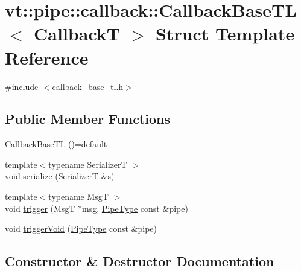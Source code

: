 \hypertarget{structvt_1_1pipe_1_1callback_1_1_callback_base_t_l}{}\section{vt\+:\+:pipe\+:\+:callback\+:\+:Callback\+Base\+TL$<$ CallbackT $>$ Struct Template Reference}
\label{structvt_1_1pipe_1_1callback_1_1_callback_base_t_l}


{\ttfamily \#include $<$callback\+\_\+base\+\_\+tl.\+h$>$}

\subsection*{Public Member Functions}
\begin{DoxyCompactItemize}
\item 
\hyperlink{structvt_1_1pipe_1_1callback_1_1_callback_base_t_l_a9fd040600f47976c437cf0b9b0eda1f5}{Callback\+Base\+TL} ()=default
\item 
{\footnotesize template$<$typename SerializerT $>$ }\\void \hyperlink{structvt_1_1pipe_1_1callback_1_1_callback_base_t_l_a5bb502d7c02bd253dc0517aa56743c71}{serialize} (SerializerT \&s)
\item 
{\footnotesize template$<$typename MsgT $>$ }\\void \hyperlink{structvt_1_1pipe_1_1callback_1_1_callback_base_t_l_ac9deeadfe2d31c1f18051f1238f6c1d7}{trigger} (MsgT $\ast$msg, \hyperlink{namespacevt_ac9852acda74d1896f48f406cd72c7bd3}{Pipe\+Type} const \&pipe)
\item 
void \hyperlink{structvt_1_1pipe_1_1callback_1_1_callback_base_t_l_a5d1658201aadd7363abf13a367c135b0}{trigger\+Void} (\hyperlink{namespacevt_ac9852acda74d1896f48f406cd72c7bd3}{Pipe\+Type} const \&pipe)
\end{DoxyCompactItemize}


\subsection{Constructor \& Destructor Documentation}
\mbox{\label{structvt_1_1pipe_1_1callback_1_1_callback_base_t_l_a9fd040600f47976c437cf0b9b0eda1f5}} 
